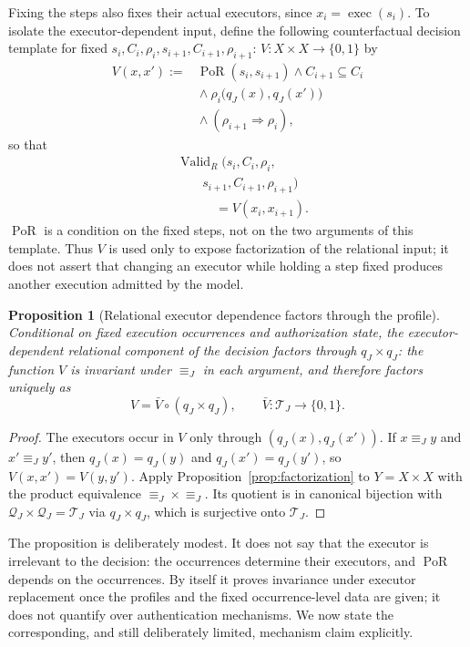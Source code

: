 \documentclass[10pt,twocolumn]{article}
\newcommand{\Profiles}{\mathcal{Q}}
\newcommand{\Transitions}{\mathcal{T}}
\newcommand{\exec}{\operatorname{exec}}
\newcommand{\ValidR}{\operatorname{Valid}_{R}}
\newcommand{\PoR}{\operatorname{PoR}}
\newtheorem{proposition}{Proposition}
\begin{document}
Fixing the steps also fixes their actual executors, since
\(x_i=\exec(s_i)\). To isolate the executor-dependent input, define the
following counterfactual decision template for fixed
\(s_i,C_i,\rho_i,s_{i+1},C_{i+1},\rho_{i+1}\):
\(V:X\times X\rightarrow\{0,1\}\) by
\[
\begin{aligned}
V(x,x')
:={}&
\PoR(s_i,s_{i+1})
\land C_{i+1}\subseteq C_i\\
&{}\land\rho_i\big(q_J(x),q_J(x')\big)\\
&{}\land(\rho_{i+1}\Rightarrow\rho_i),
\end{aligned}
\]
so that
\[
\begin{aligned}
&\ValidR(s_i,C_i,\rho_i,\\
&\qquad s_{i+1},C_{i+1},\rho_{i+1})\\
&\hspace{3em}=V(x_i,x_{i+1}).
\end{aligned}
\]
\(\PoR\) is a condition on the fixed steps, not on the two arguments of this
template. Thus \(V\) is used only to expose factorization of the relational
input; it does not assert that changing an executor while holding a step fixed
produces another execution admitted by the model.

\begin{proposition}[Relational executor dependence factors through the profile]
\label{prop:layers}
Conditional on fixed execution occurrences and authorization state, the
executor-dependent relational component of the decision factors through
\(q_J\times q_J\): the function \(V\) is invariant under \(\equiv_J\) in each
argument, and therefore factors uniquely as
\[
V=\bar V\circ(q_J\times q_J),
\qquad
\bar V:\Transitions_J\rightarrow\{0,1\}.
\]
\end{proposition}

\begin{proof}
The executors occur in \(V\) only through
\((q_J(x),q_J(x'))\). If \(x\equiv_J y\) and \(x'\equiv_J y'\), then
\(q_J(x)=q_J(y)\) and \(q_J(x')=q_J(y')\), so \(V(x,x')=V(y,y')\). Apply
Proposition~\ref{prop:factorization} to \(Y=X\times X\) with the product
equivalence \(\equiv_J\times\equiv_J\). Its quotient is in canonical bijection
with \(\Profiles_J\times\Profiles_J=\Transitions_J\) via \(q_J\times q_J\), which
is surjective onto \(\Transitions_J\).
\end{proof}

The proposition is deliberately modest. It does not say that the executor is
irrelevant to the decision: the occurrences determine their executors, and
\(\PoR\) depends on the occurrences. By itself it proves invariance under
executor replacement once the profiles and the fixed occurrence-level data are
given; it does not quantify over authentication mechanisms. We now state the
corresponding, and still deliberately limited, mechanism claim explicitly.
\end{document}
